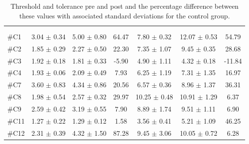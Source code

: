 \begin{longtable} {l|c|c|c|c|c|c}
\caption{Threshold and tolerance pre and post and the percentage difference between these values with associated standard deviations for the control group.}
	\label{tab:Control} \\
\cellcolor[HTML]{C0C0C0} {} & 
\multicolumn{3}{c|}{ \cellcolor[HTML]{C0C0C0}{\textbf{Threshold}}} & \multicolumn{3}{c}{ \cellcolor[HTML]{C0C0C0}{\textbf{Tolerance}}}  	\\  \rule{0pt}{3ex} 
  \cellcolor[HTML]{C0C0C0}{} &
 \multicolumn{1}{c|}{ \cellcolor[HTML]{C0C0C0}{Pre [KgF]}} & \multicolumn{1}{c|}{ \cellcolor[HTML]{C0C0C0}{Post [KgF]}} & \multicolumn{1}{c|}{ \cellcolor[HTML]{C0C0C0}{Diff [\%]}} 
 & \multicolumn{1}{|c|}{ \cellcolor[HTML]{C0C0C0}{Pre [KgF]}} 
 & \multicolumn{1}{c|}{ \cellcolor[HTML]{C0C0C0}{Post [KgF]}} & \multicolumn{1}{c|}{ \cellcolor[HTML]{C0C0C0}{Diff [\%]}} \\ \hline  
\#C1 & 3.04 $\pm$ 0.34	& 5.00 $\pm$ 0.80 & 64.47	& 7.80 $\pm$	 0.32 & 12.07 $\pm$ 0.53 & 54.79 \\ \hline
\#C2 & 1.85 $\pm$ 0.29 	& 2.27 $\pm$ 0.50 & 22.30	& 7.35 $\pm$ 1.07	& 9.45 $\pm$ 0.35 & 28.68	\\ \hline
\#C3 & 1.92 $\pm$ 0.18 & 1.81 $\pm$ 0.33 &-5.90 & 4.90 $\pm$ 1.11 	& 	4.32 $\pm$ 0.18 & -11.84	\\ \hline
\#C4 & 1.93 $\pm$ 0.06 & 2.09 $\pm$ 0.49 & 7.93	& 6.25 $\pm$ 1.19	&7.31 $\pm$ 	1.35  & 16.97 \\ \hline
\#C7 & 3.60 $\pm$ 0.83  & 4.34 $\pm$	0.86 & 20.56	& 6.57 $\pm$ 0.36 & 8.96 $\pm$ 1.37 & 36.31 \\ \hline
\#C8 & 1.98 $\pm$ 0.54 & 2.57 $\pm$ 0.32 & 29.97	& 10.25 $\pm$ 0.48	& 10.91 $\pm$  1.29 & 6.37 \\ \hline
\#C9 & 2.59 $\pm$ 0.42 & 3.19 $\pm$ 0.55 & 7.90 & 8.89 $\pm$ 1.74	& 9.51 $\pm$  1.11 & 6.90 \\ \hline
\#C11 & 1.27 $\pm$ 0.22 & 1.29 	$\pm$ 0.12 & 1.58 	& 3.56 $\pm$ 0.41 & 5.21 $\pm$ 1.09 & 46.25 \\ \hline
\#C12 & 2.31 $\pm$ 0.39 & 4.32 $\pm$ 1.50 & 87.28 	& 9.45 $\pm$ 3.06 & 10.05 $\pm$ 0.72 & 6.28 \\ \hline

\end{longtable}
